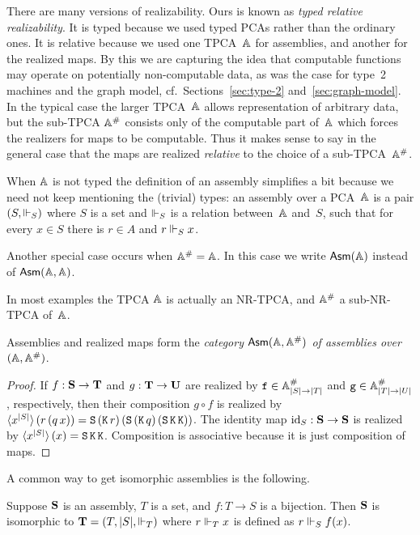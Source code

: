 There are many versions of realizability. Ours is known as \emph{typed
  relative realizability}. It is typed because we used typed PCAs
rather than the ordinary ones. It is relative because we used one
TPCA~$\AA$ for assemblies, and another for the realized maps. By this we
are capturing the idea that computable functions may operate on
potentially non-computable data, as was the case for type~2 machines
and the graph model, cf.\ Sections~\ref{sec:type-2}
and~\ref{sec:graph-model}. In the typical case the larger TPCA~$\AA$
allows representation of arbitrary data, but the sub-TPCA $\compAA$
consists only of the computable part of~$\AA$ which forces the realizers
for maps to be computable. Thus it makes sense to say in the general
case that the maps are realized \emph{relative} to the choice of a
sub-TPCA~$\compAA$.

When $\AA$ is not typed the definition of an assembly simplifies a bit
because we need not keep mentioning the (trivial) types: an assembly
over a PCA~$\AA$ is a pair $(S, {\rz_S})$ where $S$ is a set and $\rz_S$
is a relation between~$\AA$ and~$S$, such that for every $x \in S$ there
is $r \in A$ and $r \rz_S x$.

Another special case occurs when $\compAA = \AA$. In this case we write
$\Asm{\AA}$ instead of $\Asm{\AA,\AA}$.

In most examples the TPCA $\AA$ is actually an NR-TPCA, and $\compAA$ a
sub-NR-TPCA of~$\AA$.

\begin{proposition}
  Assemblies and realized maps form the \emph{category $\AsmA$ of
    assemblies over $(\AA, \compAA)$}.
\end{proposition}

\begin{proof}
  If $f : \asm{S} \to \asm{T}$ and $g : \asm{T} \to \asm{U}$ are
  realized by $\R{f} \in \compAtyp{|S| \to |T|}$ and $\R{g} \in
  \compAtyp{|T| \to |U|}$, respectively, then their composition $g
  \circ f$ is realized by $\pcalam{\annot{x}{|S|}}{r\,(q\,x)} =
  \combS\,(\combK\,r)\,(\combS\,(\combK\,q)\,(\combS\,\combK\,\combK))$.
  The identity map $\id_S : \asm{S} \to \asm{S}$ is realized by
  $\pcalam{\annot{x}{|S|}}{x} = \combS\,\combK\,\combK$. Composition
  is associative because it is just composition of maps.
\end{proof}

A common way to get isomorphic assemblies is the following.

\begin{lemma}
  \label{lemma:iso-assembly}
  Suppose $\asm{S}$ is an assembly, $T$ is a set, and $f : T \to S$ is
  a bijection. Then $\asm{S}$ is isomorphic to $\asm{T} = (T, |S|,
  {\rz_T})$ where $r \rz_T x$ is defined as $r \rz_S f(x)$.
\end{lemma}

